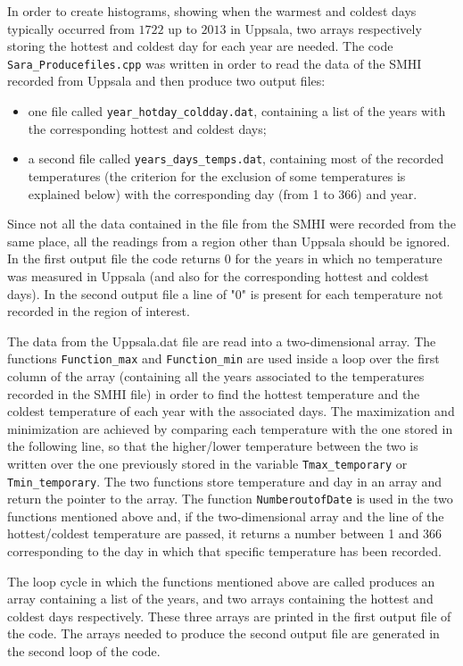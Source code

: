 \documentclass[a4paper]{article}
\begin{document}
In order to create histograms, showing when the warmest and coldest days typically occurred from $1722$ up to $2013$ in Uppsala, two
arrays respectively storing the hottest and coldest day for each year are needed. The code \texttt{Sara{\_}Producefiles.cpp} was written in order to read the data of
the SMHI recorded from Uppsala and then produce two output files:
\begin{itemize}
\item one file called \texttt{year\_hotday\_coldday.dat}, containing a list of the years with the corresponding hottest and coldest days; 
\item a second file called \texttt{years\_days\_temps.dat}, containing most of the recorded temperatures (the criterion for the exclusion of some temperatures is explained below) with the corresponding day 
(from 1 to 366) and year.
\end{itemize}
\medskip
Since not all the data contained in the file from the SMHI were  recorded from the same place, all the readings from a region other
than Uppsala should be ignored. In the first output file the code returns $0$  for the years in which no temperature was measured in Uppsala (and also for the corresponding hottest and coldest days). In the second output file a line of "$0$" is present for each temperature not recorded in the region of interest.

\medskip
\medskip
The data from the Uppsala.dat file are read into a two-dimensional array. The functions \texttt{Function{\_}max} and \texttt{Function{\_}min} are used inside a loop over the first column of the array (containing all the years associated to the temperatures recorded in the 
SMHI file) in order to find the hottest temperature and the coldest temperature of each year with the associated days. The maximization
and minimization are achieved by comparing each temperature with the one stored in the following line, so that the higher/lower temperature between the two is written over the one previously stored in the variable \texttt{Tmax\_temporary} or \texttt{Tmin\_temporary}. The two functions store temperature and day in an array and return the pointer to the array. The function \texttt{NumberoutofDate}
is used in the two functions mentioned above and, if the two-dimensional array and the line of the hottest/coldest temperature
are passed, it returns a number between 1 and 366 corresponding to the day in which that specific temperature has been recorded. 

\medskip

The loop cycle in which the functions mentioned above are called produces an array containing a list of the years, and two arrays containing the hottest and coldest days respectively. These three arrays are printed in the first output file of the code.
The arrays needed to produce the second output file are generated in the second loop of the code.
\end{document}
